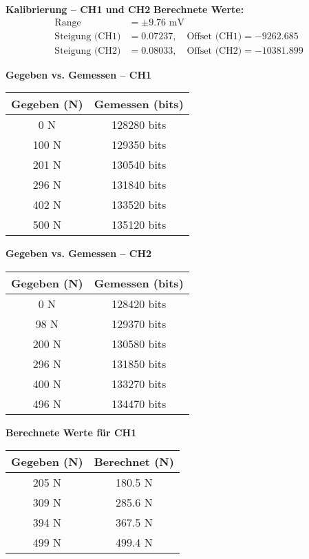 \textbf{Kalibrierung – CH1 und CH2}
\textbf{Berechnete Werte:}
\begin{align*}
\text{Range} &= \pm 9.76 \text{ mV} \\
\text{Steigung (CH1)} &= 0.07237, \quad \text{Offset (CH1)} = -9262.685 \\
\text{Steigung (CH2)} &= 0.08033, \quad \text{Offset (CH2)} = -10381.899
\end{align*}

\clearpage
\textbf{Gegeben vs. Gemessen – CH1}
\begin{center}
\begin{tabular}{|c|c|}
\hline
\textbf{Gegeben (N)} & \textbf{Gemessen (bits)} \\
\hline
0 N & 128280 bits \\
100 N & 129350 bits \\
201 N & 130540 bits \\
296 N & 131840 bits \\
402 N & 133520 bits \\
500 N & 135120 bits \\
\hline
\end{tabular}
\end{center}

\textbf{Gegeben vs. Gemessen – CH2}
\begin{center}
\begin{tabular}{|c|c|}
\hline
\textbf{Gegeben (N)} & \textbf{Gemessen (bits)} \\
\hline
0 N & 128420 bits \\
98 N & 129370 bits \\
200 N & 130580 bits \\
296 N & 131850 bits \\
400 N & 133270 bits \\
496 N & 134470 bits \\
\hline
\end{tabular}
\end{center}

\textbf{Berechnete Werte für CH1}
\begin{center}
\begin{tabular}{|c|c|}
\hline
\textbf{Gegeben (N)} & \textbf{Berechnet (N)} \\
\hline
205 N & 180.5 N \\
309 N & 285.6 N \\
394 N & 367.5 N \\
499 N & 499.4 N \\
\hline
\end{tabular}
\end{center}

